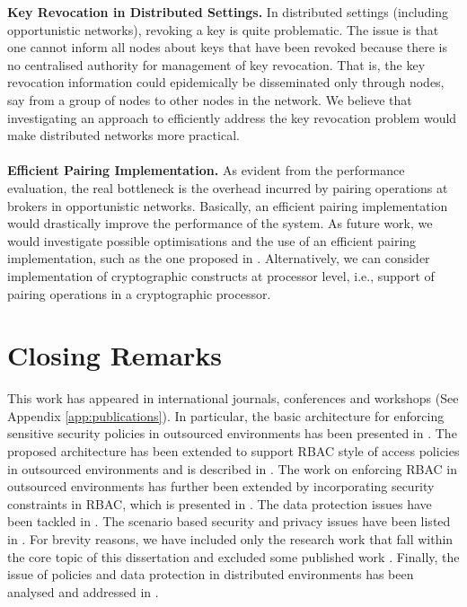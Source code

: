 \documentclass[epsfig,a4paper,11pt,titlepage]{book}
\numberwithin{algorithm}{chapter}
\begin{document}
\noindent \textbf{Key Revocation in Distributed Settings.}
In distributed settings (including opportunistic networks), revoking a key is quite problematic. The issue is that one cannot inform all nodes about keys that have been revoked because there is no centralised authority for management of key revocation. That is, the key revocation information could epidemically be disseminated only through nodes, say from a group of nodes to other nodes in the network. We believe that investigating an approach to efficiently address the key revocation problem would make distributed networks more practical. \\ \\
\noindent \textbf{Efficient Pairing Implementation.}
As evident from the performance evaluation, the real bottleneck is the overhead incurred by pairing operations at brokers in opportunistic networks. Basically, an efficient pairing implementation would drastically improve the performance of the system. As future work, we would investigate possible optimisations and the use of an efficient pairing implementation, such as the one proposed in \cite{Grewal:2013}. Alternatively, we can consider implementation of cryptographic constructs at processor level, i.e., support of pairing operations in a cryptographic processor.




\section{Closing Remarks}
This work has appeared in international journals, conferences and workshops (See Appendix \ref{app:publications}). In particular, the basic architecture for enforcing sensitive security policies in outsourced environments has been presented in \cite{Asghar2011-ARES}. The proposed architecture has been extended to support \gls{RBAC} style of access policies in outsourced environments and is described in \cite{Asghar2013-COSE, Asghar2011-CCS}. The work on enforcing \gls{RBAC} in outsourced environments has further been extended by incorporating security constraints in \gls{RBAC}, which is presented in \cite{Asghar2013:IJIS:EGRANT}. The data protection issues have been tackled in \cite{Asghar2013:CCSW, Asghar2011-iNetSec-Provenance}. The scenario based security and privacy issues have been listed in \cite{Asghar2012-SmartGridSec}. For brevity reasons, we have included only the research work that fall within the core topic of this dissertation and excluded some published work \cite{Asghar2013:CCSW, Asghar2011-iNetSec-Provenance, Asghar2012-SmartGridSec}. Finally, the issue of policies and data protection in distributed environments has been analysed and addressed in \cite{Asghar2013:NDSS:PIDGIN}.
\end{document}
